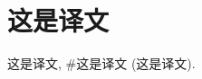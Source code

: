 \documentclass[sigconf]{acmart}
\begin{document}
	
	
	\section{这是译文}
 这是译文, \#这是译文 (这是译文).
	
	
	
	 
	
\end{document}
